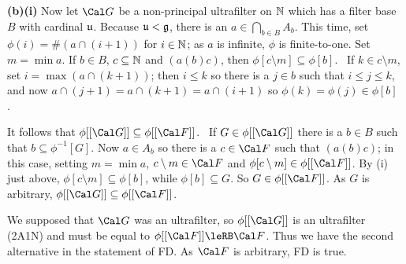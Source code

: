 {\medskip

{\bf (b)(i)} 
Now let $\Cal G$ be a non-principal ultrafilter on $\Bbb N$ which
has a filter base $B$ with cardinal $\frak u$.   Because
$\frak u<\frak g$, there is an $a\in\bigcap_{b\in B}A_b$.
This time, set $\phi(i)=\#(a\cap(i+1))$ for $i\in\Bbb N$;  
as $a$ is infinite, $\phi$ is finite-to-one.   Set $m=\min a$.
If $b\in B$, $c\subseteq\Bbb N$ and $(a(b)c)$, then 
$\phi[c\setminus m]\subseteq\phi[b]$.
\Prf\ If $k\in c\setminus m$, set $i=\max(a\cap(k+1))$;  then
$i\le k$ so there is a $j\in b$ such that $i\le j\le k$, and now
$a\cap(j+1)=a\cap(k+1)=a\cap(i+1)$ so $\phi(k)=\phi(j)\in\phi[b]$.\ \Qed\

\medskip

It follows that $\phi[[\Cal G]]\subseteq\phi[[\Cal F]]$.   \Prf\ If
$G\in\phi[[\Cal G]]$ there is a $b\in B$ such that
$b\subseteq\phi^{-1}[G]$.   Now $a\in A_b$ so there is a $c\in\Cal F$ such
that $(a(b)c)$;  in this case, setting $m=\min a$, 
$c\setminus m\in\Cal F$ and $\phi[c\setminus m]\in\phi[[\Cal F]]$.
By (i) just above, $\phi[c\setminus m]\subseteq\phi[b]$, while
$\phi[b]\subseteq G$.   So $G\in\phi[[\Cal F]]$.   As $G$ is arbitrary,
$\phi[[\Cal G]]\subseteq\phi[[\Cal F]]$.\ \Qed

\medskip

 We supposed that
$\Cal G$ was an ultrafilter, so $\phi[[\Cal G]]$ is an ultrafilter (2A1N)
and must be equal to $\phi[[\Cal F]]\leRB\Cal F$.   Thus
we have the second alternative in the statement of FD.   As $\Cal F$ is
arbitrary, FD is true.
}%

